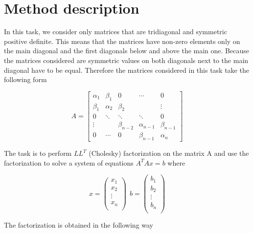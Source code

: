 \documentclass[12pt]{article}
\begin{document}
\lstset{language=Matlab}
\maketitle

\section{Method description}

In this task, we consider only matrices that are tridiagonal and symmetric positive definite. This means that the matrices have non-zero elements only on the main diagonal and the first diagonals below and above the main one. Because the matrices considered are symmetric values on both diagonals next to the main diagonal have to be equal. Therefore the matrices considered in this task take the following form

$$
A= \left[
\begin{array}{ccccc}
\alpha_1 & \beta_1 & 0 &\cdots&0\\
\beta_1 & \alpha_2 & \beta_2 & &\vdots\\
0 &\ddots&\ddots&\ddots& 0\\
\vdots&  & \beta_{n-2} & \alpha_{n-1} & \beta_{n-1}\\
0 & \cdots& 0 & \beta_{n-1} & \alpha_n
\end{array}
\right]
$$

The task is to perform $LL^T$ (Cholesky) factorization on the matrix A and use the factorization to solve a system of equations $A^TAx=b$ where 

$$
x=\left(
\begin{array}{c}
x_1\\
x_2\\
\vdots\\
x_n\\
\end{array}
\right)
\ \
b=\left(
\begin{array}{c}
b_1\\
b_2\\
\vdots\\
b_n\\
\end{array}
\right)
$$

The factorization is obtained in the following way\\
\end{document}
